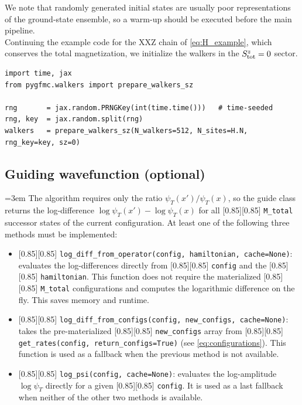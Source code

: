 \documentclass{SciPost}
\newcommand{\pyinline}[1]{\begingroup\setlength{\fboxsep}{0pt}%
  \colorbox{gray!15}{\raisebox{0pt}[0.85\ht\strutbox][0.85\dp\strutbox]{%
    \hspace{1pt}\lstinline{#1}\hspace{1pt}}}\endgroup}
\begin{document}
We note that randomly generated initial states are usually poor representations of the ground-state ensemble, so a warm-up should be executed before the main pipeline.\\

Continuing the example code for the XXZ chain of \autoref{eq:H_example}, which conserves the total magnetization, we initialize the walkers in the $S^z_{\rm tot} = 0$ sector.
\begin{lstlisting}
import time, jax
from pygfmc.walkers import prepare_walkers_sz

rng       = jax.random.PRNGKey(int(time.time()))   # time-seeded
rng, key  = jax.random.split(rng)
walkers   = prepare_walkers_sz(N_walkers=512, N_sites=H.N, rng_key=key, sz=0)
\end{lstlisting}

\subsection{Guiding wavefunction (optional)}\label{sec:pkg:guide}
{\emergencystretch=3em
The algorithm requires only the ratio $\psi_T(x')/\psi_T(x)$, so the guide class returns the log-difference $\log \psi_T(x') - \log \psi_T(x)$ for all \pyinline{M_total} successor states of the current configuration.
%
At least one of the following three methods must be implemented:
\begin{itemize}
	\item \pyinline{log_diff_from_operator(config, hamiltonian, cache=None)}: evaluates the log-differences directly from \pyinline{config} and the \pyinline{hamiltonian}.
		This function does not require the materialized \pyinline{M_total} configurations and computes the logarithmic difference on the fly.
		This saves memory and runtime.

	\item \pyinline{log_diff_from_configs(config, new_configs, cache=None)}: takes the pre-materialized \pyinline{new_configs} array from \pyinline{get_rates(config, return_configs=True)} (see \autoref{eq:configurations}).
		This function is used as a fallback when the previous method is not available.

	\item \pyinline{log_psi(config, cache=None)}:
		evaluates the log-amplitude $\log\psi_T$ directly for a given \pyinline{config}.
		It is used as a last
	fallback when neither of the other two methods is available.
\end{itemize}
}
\end{document}
